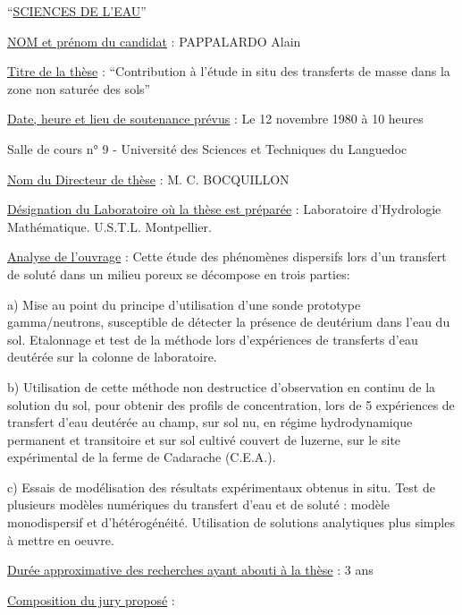 ``\uline{SCIENCES DE L'EAU}''

\uline{NOM et prénom du candidat} : PAPPALARDO Alain

\uline{Titre de la thèse} : ``Contribution à l'étude in situ des transferts de masse dans la zone non saturée des sols''

\uline{Date, heure et lieu de soutenance prévus} : Le 12 novembre 1980 à 10 heures

Salle de cours n° 9 - Université des Sciences et Techniques du Languedoc

\uline{Nom du Directeur de thèse} : M. C. BOCQUILLON

\uline{Désignation du Laboratoire où la thèse est préparée} : Laboratoire d'Hydrologie Mathématique. U.S.T.L. Montpellier.

\uline{Analyse de l'ouvrage} : Cette étude des phénomènes dispersifs lors d'un transfert de soluté dans un milieu poreux se décompose en trois parties:

a) Mise au point du principe d'utilisation d'une sonde prototype gamma/neutrons, susceptible de détecter la présence de deutérium dans l'eau du sol. Etalonnage et test de la méthode lors d'expériences de transferts d'eau deutérée sur la colonne de laboratoire.

b) Utilisation de cette méthode non destructice d'observation en continu de la solution du sol, pour obtenir des profils de concentration, lors de 5 expériences de transfert d'eau deutérée au champ, sur sol nu, en régime hydrodynamique permanent et transitoire et sur sol cultivé couvert de luzerne, sur le site expérimental de la ferme de Cadarache (C.E.A.).

c) Essais de modélisation des résultats expérimentaux obtenus in situ. Test de plusieurs modèles numériques du transfert d'eau et de soluté : modèle monodispersif et d'hétérogénéité. Utilisation de solutions analytiques plus simples à mettre en oeuvre.

\uline{Durée approximative des recherches ayant abouti à la thèse} : 3 ans

\uline{Composition du jury proposé} :

